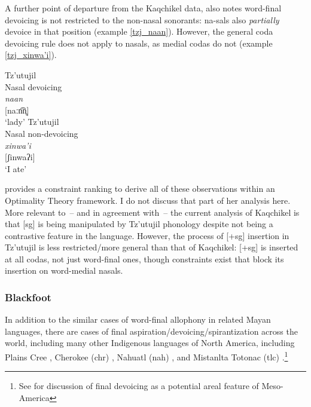 \documentclass[output=paper,colorlinks,citecolor=brown]{langscibook}
\begin{document}
A further point of departure from the Kaqchikel data, \citet{wax_cavallaro_2020} also notes word-final devoicing is not restricted to the non-nasal sonorants: na-sals also \emph{partially} devoice in that position (example \ref{tzj_naan}). However, the general coda devoicing rule does not apply to nasals, as medial codas do not (example \ref{tzj_xinwa’i}). 
\begin{multicols}{2}
\ea
    \ea\label{tzj_naan}
    Tz’utujil \citep{dayley_1985}\\
    Nasal devoicing \\
    \gll\emph{naan} \\
    {}[naːn͡n̥] \\
    \glt ‘lady’ 
    \columnbreak
        \ex\label{tzj_xinwa’i}
        Tz’utujil \citep{dayley_1985}\\
        Nasal non-devoicing \\
        \gll\emph{xinwa’i} \\
        {}[ʃinwaʔi] \\
        \glt ‘I ate’ 
    \z
\z
\end{multicols}

\citet{wax_cavallaro_2020} provides a constraint ranking to derive all of these observations within an Optimality Theory framework. I do not discuss that part of her analysis here. More relevant to~-- and in agreement with~-- the current analysis of Kaqchikel is that [sg] is being manipulated by Tz’utujil phonology despite not being a contrastive feature in the language. However, the process of [+sg] insertion in Tz’utujil is less restricted/more general than that of Kaqchikel: [+sg] is inserted at all codas, not just word-final ones, though constraints exist that block its insertion on word-medial nasals.

\subsubsection{Blackfoot}\label{Blackfoot}
In addition to the similar cases of word-final allophony in related Mayan languages, there are cases of final aspiration/devoicing/spirantization across the world, including many other Indigenous languages of North America, including Plains Cree \citep{flynn_hodgson_windsor_2019}, Cherokee (chr) \citep{montgomery-anderson_2008}, Nahuatl (nah) \citep{launey_1992}, and Mistanlta Totonac (tlc) \citep{mackay_1994}.\footnote{See \citet{campbell_kaufman_smith-stark_1986} for discussion of final devoicing as a potential areal feature of Meso-America}
\end{document}
